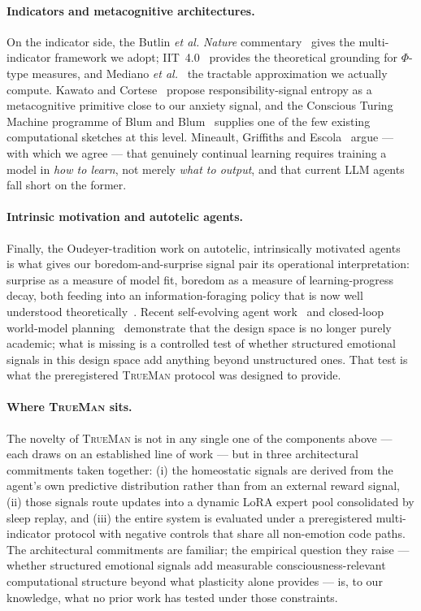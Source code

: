 \documentclass[pdflatex,sn-mathphys-num]{sn-jnl}
\newcommand{\TrueMan}{\textsc{TrueMan}}
\theoremstyle{thmstyleone}
\theoremstyle{thmstylethree}
\begin{document}
\paragraph{Indicators and metacognitive architectures.} On the indicator side, the Butlin \emph{et al.} \emph{Nature} commentary~\cite{butlin2023consciousness} gives the multi-indicator framework we adopt; IIT~4.0~\cite{tononi2023iit} provides the theoretical grounding for $\Phi$-type measures, and Mediano \emph{et al.}~\cite{mediano2021phir} the tractable approximation we actually compute. Kawato and Cortese~\cite{kawato2023metacognitive} propose responsibility-signal entropy as a metacognitive primitive close to our anxiety signal, and the Conscious Turing Machine programme of Blum and Blum~\cite{blum2023ctm} supplies one of the few existing computational sketches at this level. Mineault, Griffiths and Escola~\cite{mineault2026dark} argue --- with which we agree --- that genuinely continual learning requires training a model in \emph{how to learn}, not merely \emph{what to output}, and that current LLM agents fall short on the former.

\paragraph{Intrinsic motivation and autotelic agents.} Finally, the Oudeyer-tradition work on autotelic, intrinsically motivated agents~\cite{colas2022autotelic, colas2022survey} is what gives our boredom-and-surprise signal pair its operational interpretation: surprise as a measure of model fit, boredom as a measure of learning-progress decay, both feeding into an information-foraging policy that is now well understood theoretically~\cite{sukhija2024maxinforl, chakraborty2023steering}. Recent self-evolving agent work~\cite{zhai2025agentevolver, putta2024agentq} and closed-loop world-model planning~\cite{li2025closedloop} demonstrate that the design space is no longer purely academic; what is missing is a controlled test of whether structured emotional signals in this design space add anything beyond unstructured ones. That test is what the preregistered \TrueMan{} protocol was designed to provide.

\paragraph{Where \TrueMan{} sits.} The novelty of \TrueMan{} is not in any single one of the components above --- each draws on an established line of work --- but in three architectural commitments taken together: (i) the homeostatic signals are derived from the agent's own predictive distribution rather than from an external reward signal, (ii) those signals route updates into a dynamic LoRA expert pool consolidated by sleep replay, and (iii) the entire system is evaluated under a preregistered multi-indicator protocol with negative controls that share all non-emotion code paths. The architectural commitments are familiar; the empirical question they raise --- whether structured emotional signals add measurable consciousness-relevant computational structure beyond what plasticity alone provides --- is, to our knowledge, what no prior work has tested under those constraints.
\end{document}
